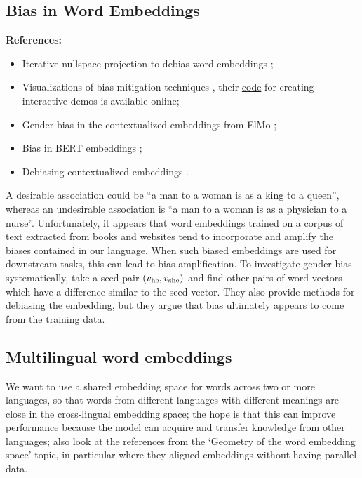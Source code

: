 \documentclass[11pt, a4paper]{amsart}
\begin{document}
\subsection{Bias in Word Embeddings}

\noindent \textbf{References:}
\begin{itemize}
	\item Iterative nullspace projection to debias word embeddings \cite{ravfogel-etal-2020-null};
	\item Visualizations of bias mitigation techniques \cite{DBLP:journals/corr/abs-2104-02797},
	their \href{https://github.com/tdavislab/verb}{code} for creating interactive demos is available online;
	\item Gender bias in the contextualized embeddings from ElMo \cite{zhao-etal-2019-gender};
	\item Bias in BERT embeddings \cite{kurita-etal-2019-measuring};
	\item Debiasing contextualized embeddings \cite{kaneko-bollegala-2021-debiasing}.
\end{itemize}

{
	\color{blue}
	
	A desirable association could be ``a man to a woman is as a king to a queen'', whereas an undesirable association is ``a man to a woman is as a physician to a nurse''.
	Unfortunately, it appears that word embeddings trained on a corpus of text extracted from books and websites tend to incorporate and amplify the biases contained in our language.
	When such biased embeddings are used for downstream tasks, this can lead to bias amplification.
	To investigate gender bias systematically, \cite{DBLP:journals/corr/BolukbasiCZSK16a} take a seed pair $(v_\textup{he}, v_\textup{she})$ and find other pairs of word vectors which have a difference similar to the seed vector.
	They also provide methods for debiasing the embedding, but they argue that bias ultimately appears to come from the training data.
} %

\subsection{Multilingual word embeddings}

We want to use a shared embedding space for words across two or more languages, so that words from different languages with different meanings are close in the cross-lingual embedding space;
the hope is that this can improve performance because the model can acquire and transfer knowledge from other languages;
also look at the references from the `Geometry of the word embedding space'-topic, in particular \cite{DBLP:journals/corr/abs-1710-04087} where they aligned embeddings without having parallel data.
\end{document}
